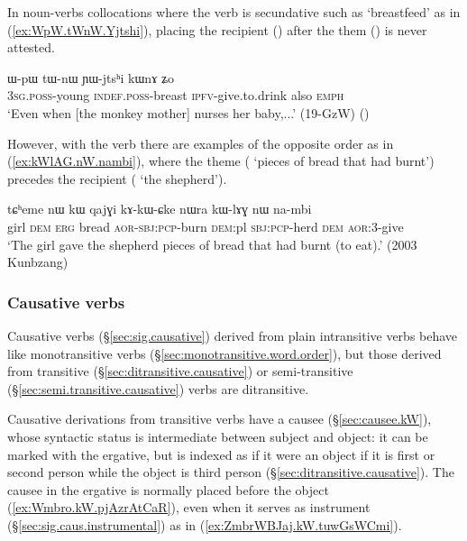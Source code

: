 In noun-verbs collocations where the verb is secundative such as  `breastfeed' as in (\ref{ex:WpW.tWnW.Yjtshi}), placing the recipient () after the them () is never attested.

\begin{exe}
\ex \label{ex:WpW.tWnW.Yjtshi}
\gll ɯ-pɯ tɯ-nɯ ɲɯ-jtsʰi kɯnɤ ʑo \\
\textsc{3sg}.\textsc{poss}-young \textsc{indef}.\textsc{poss}-breast \textsc{ipfv}-give.to.drink also \textsc{emph} \\
\glt `Even when [the monkey mother] nurses her baby,...' (19-GzW)
()
\end{exe}


However, with the verb  there are examples of the opposite order as in (\ref{ex:kWlAG.nW.nambi}), where the theme ( `pieces of bread that had burnt') precedes the recipient ( `the shepherd').


\begin{exe}
\ex \label{ex:kWlAG.nW.nambi}
\gll  tɕʰeme nɯ kɯ qajɣi kɤ-kɯ-ɕke nɯra kɯ-lɤɣ nɯ na-mbi \\
girl \textsc{dem} \textsc{erg} bread \textsc{aor}-\textsc{sbj}:\textsc{pcp}-burn \textsc{dem}:pl \textsc{sbj}:\textsc{pcp}-herd \textsc{dem} \textsc{aor}:3\flobv{}-give \\
\glt `The girl gave the shepherd pieces of bread that had burnt (to eat).' (2003 Kunbzang)
\end{exe}

\subsubsection{Causative verbs} \label{sec:causative.word.order}
Causative verbs (§\ref{sec:sig.causative}) derived from plain intransitive verbs behave like monotransitive verbs (§\ref{sec:monotransitive.word.order}), but those derived from transitive (§\ref{sec:ditransitive.causative}) or semi-transitive (§\ref{sec:semi.transitive.causative}) verbs are ditransitive.

Causative derivations from transitive verbs have a causee (§\ref{sec:causee.kW}), whose syntactic status is intermediate between subject and object: it can be marked with the ergative, but is indexed as if it were an object if it is first or second person while the object is third person (§\ref{sec:ditransitive.causative}). The causee in the ergative is normally placed before the object (\ref{ex:Wmbro.kW.pjAzrAtCaR}), even when it serves as instrument (§\ref{sec:sig.caus.instrumental}) as in (\ref{ex:ZmbrWBJaj.kW.tuwGsWCmi}).


